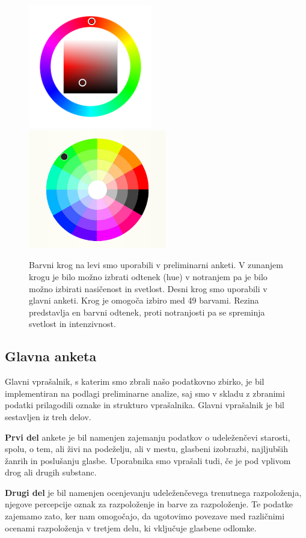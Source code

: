 \documentclass[a4paper, 12pt]{book}
\begin{document}
{\begin{figure}[ht]
\centering
\includegraphics[width=54mm]{colorwheelold.png}
\includegraphics[width=60mm]{colorwheel.png}

\caption{Barvni krog na levi smo uporabili v preliminarni anketi. V zunanjem krogu je bilo možno izbrati odtenek (hue) v notranjem pa je bilo možno izbirati nasičenost in svetlost. Desni krog smo uporabili v glavni anketi. Krog je omogoča izbiro med 49 barvami. Rezina predstavlja en barvni odtenek, proti notranjosti pa se spreminja svetlost in intenzivnost. }
\label{colorwheels}
\end{figure}

\subsection{Glavna anketa}
\label{glavnaanketa}

Glavni vprašalnik, s katerim smo zbrali našo podatkovno zbirko, je bil implementiran na podlagi preliminarne analize, saj smo v skladu z zbranimi podatki prilagodili oznake in strukturo vprašalnika. Glavni vprašalnik je bil sestavljen iz treh delov.


\textbf{Prvi del} ankete je bil namenjen zajemanju podatkov o  udeleženčevi starosti, spolu, o tem, ali živi na podeželju, ali v mestu, glasbeni izobrazbi, najljubših žanrih in poslušanju glasbe. Uporabnika smo vprašali tudi, če je pod vplivom drog ali drugih substanc.  

\textbf{Drugi del} je bil namenjen ocenjevanju udeleženčevega trenutnega razpoloženja, njegove percepcije oznak za razpoloženje in barve za razpoloženje. Te podatke zajemamo zato, ker nam omogočajo, da ugotovimo povezave med različnimi ocenami razpoloženja v tretjem delu, ki vključuje glasbene odlomke.

}
\end{document}
